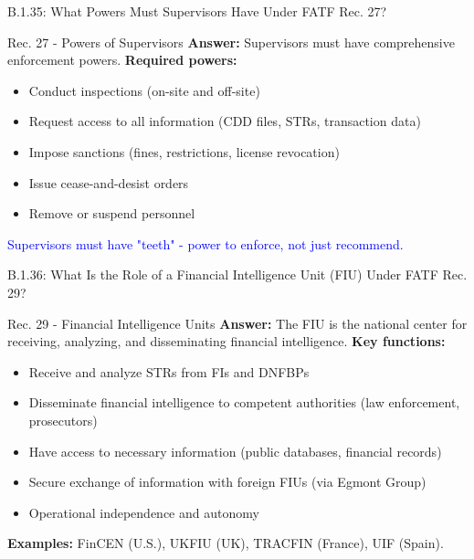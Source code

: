 \documentclass{beamer}
\begin{document}
	\begin{frame}{B.1.35: What Powers Must Supervisors Have Under FATF Rec. 27?}
		\begin{block}{Rec. 27 - Powers of Supervisors}
			\textbf{Answer:} Supervisors must have comprehensive enforcement powers.
			\vspace{0.2cm}
			\textbf{Required powers:}
			\begin{itemize}
				\item Conduct inspections (on-site and off-site)
				\item Request access to all information (CDD files, STRs, transaction data)
				\item Impose sanctions (fines, restrictions, license revocation)
				\item Issue cease-and-desist orders
				\item Remove or suspend personnel
			\end{itemize}
			\textcolor{blue}{Supervisors must have "teeth" - power to enforce, not just recommend.}
		\end{block}
	\end{frame}
	
	\begin{frame}{B.1.36: What Is the Role of a Financial Intelligence Unit (FIU) Under FATF Rec. 29?}
		\begin{block}{Rec. 29 - Financial Intelligence Units}
			\textbf{Answer:} The FIU is the national center for receiving, analyzing, and disseminating financial intelligence.
			\vspace{0.2cm}
			\textbf{Key functions:}
			\begin{itemize}
				\item Receive and analyze STRs from FIs and DNFBPs
				\item Disseminate financial intelligence to competent authorities (law enforcement, prosecutors)
				\item Have access to necessary information (public databases, financial records)
				\item Secure exchange of information with foreign FIUs (via Egmont Group)
				\item Operational independence and autonomy
			\end{itemize}
			\textbf{Examples:} FinCEN (U.S.), UKFIU (UK), TRACFIN (France), UIF (Spain).
		\end{block}
	\end{frame}
	
\end{document}
